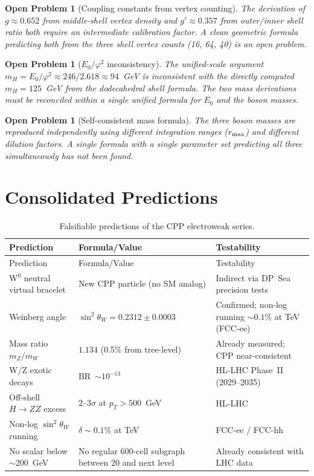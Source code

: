 \documentclass[11pt,a4paper]{article}
\newtheorem{openprob}[theorem]{Open Problem}
\newcommand{\phig}{\varphi}
\begin{document}
\begin{openprob}[Coupling constants from vertex counting]
\label{op:coupling}
The derivation of $g \approx 0.652$ from middle-shell vertex density
and $g' \approx 0.357$ from outer/inner shell ratio both require an
intermediate calibration factor.  A clean geometric formula predicting
both from the three shell vertex counts (16, 64, 40) is an open problem.
\end{openprob}

\begin{openprob}[$E_0/\phig^2$ inconsistency]
\label{op:e0}
The unified-scale argument $m_H = E_0/\phig^2
\approx 246/2.618 \approx 94$~GeV is inconsistent with the directly
computed $m_H = 125$~GeV from the dodecahedral shell formula.  The two
mass derivations must be reconciled within a single unified formula for
$E_0$ and the boson masses.
\end{openprob}

\begin{openprob}[Self-consistent mass formula]
\label{op:mass}
The three boson masses are reproduced independently using different
integration ranges ($r_{\rm max}$) and different dilution factors.
A single formula with a single parameter set predicting all three
simultaneously has not been found.
\end{openprob}

\section{Consolidated Predictions}

\begin{longtable}{@{}p{5cm}p{4cm}p{4cm}@{}}
\caption{Falsifiable predictions of the CPP electroweak series.}
\label{tab:predictions}\\
\toprule
Prediction & Formula/Value & Testability \\
\midrule
\endfirsthead
\toprule
Prediction & Formula/Value & Testability \\
\midrule
\endhead
\bottomrule
\endfoot
W$^0$ neutral virtual bracelet
  & New CPP particle (no SM analog)
  & Indirect via DP~Sea precision tests \\[4pt]
Weinberg angle
  & $\sin^2\theta_W = 0.2312\pm0.0003$
  & Confirmed; non-log running $\sim0.1\%$ at TeV (FCC-ee) \\[4pt]
Mass ratio $m_Z/m_W$
  & $1.134$ (0.5\% from tree-level)
  & Already measured; CPP near-consistent \\[4pt]
W/Z exotic decays
  & BR~$\sim10^{-13}$
  & HL-LHC Phase~II (2029--2035) \\[4pt]
Off-shell $H\to ZZ$ excess
  & $2$--$3\sigma$ at $p_T>500$~GeV
  & HL-LHC \\[4pt]
Non-log $\sin^2\theta_W$ running
  & $\delta\sim0.1\%$ at TeV
  & FCC-ee / FCC-hh \\[4pt]
No scalar below $\sim200$~GeV
  & No regular 600-cell subgraph between 20 and next level
  & Already consistent with LHC data \\
\end{longtable}
\end{document}
